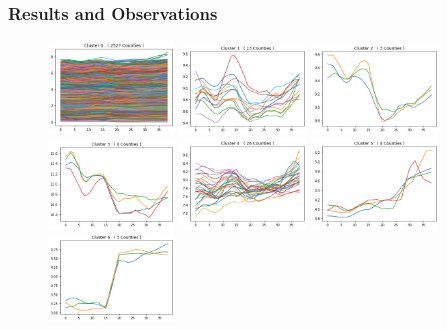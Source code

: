 \documentclass{article}
\begin{document}
\subsubsection{Results and Observations}

\begin{figure}[h]
	\centering
	\includegraphics[width=0.3\textwidth]{images/cluster0}
	\includegraphics[width=0.3\textwidth]{images/cluster1}
	\includegraphics[width=0.3\textwidth]{images/cluster2}
	\includegraphics[width=0.3\textwidth]{images/cluster3}
	\includegraphics[width=0.3\textwidth]{images/cluster4}
	\includegraphics[width=0.3\textwidth]{images/cluster5}
	\includegraphics[width=0.3\textwidth]{images/cluster6}

\end{figure}
\end{document}
